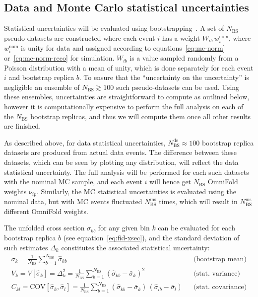 \subsection{Data and Monte Carlo statistical uncertainties}
Statistical uncertainties will be evaluated using bootstrapping~\cite{ATLAS-bootstrap}.  A set of $N_\mathrm{BS}$ pseudo-datasets are constructed where each event $i$ has a weight $W_{ib}\,w^\text{nom}_i$, where $w^\text{nom}_{i}$ is unity for data and assigned according to equations~\ref{eq:mc-norm} or~\ref{eq:mc-norm-reco} for simulation. $W_{ib}$ is a value sampled randomly from a Poisson distribution with a mean of unity, which is done separately for each event $i$ and bootstrap replica $b$.  To ensure that the ``uncertainty on the uncertainty'' is negligible an ensemble of $N_\mathrm{BS} \gtrsim 100$ such pseudo-datasets can be used.
Using these ensembles, uncertainties are straightforward to compute as outlined below, however it is computationally expensive to perform the full analysis on each of the $N_\mathrm{BS}$ bootstrap replicas, and thus we will compute them once all other results are finished.

As described above, for data statistical uncertainties, $N_\mathrm{BS}^\mathrm{ds} \approx 100$ bootstrap replica datasets are produced from actual data events.
The difference between these datasets, which can be seen by plotting any distribution, will reflect the data statistical uncertainty.
The full analysis will be performed for each such datasets with the nominal MC sample, and each event $i$ will hence get $N_\mathrm{BS}$ OmniFold weights $\nu_{ip}$. 
Similarly, the MC statistical uncertainties is evaluated using the nominal data, but with MC events fluctuated $N_\mathrm{BS}^\mathrm{ms}$ times, which will result in $N_\mathrm{BS}^\mathrm{ms}$ different OmniFold weights.

The unfolded cross section $\sigma_{kb}$ for any given bin $k$ can be evaluated for each bootstrap replica $b$ (see equation~\ref{eq:fid-xsec}), and the standard  deviation of such estimates $\Delta_{k}$ constitutes the associated statistical uncertainty:
\begin{eqnarray}
  \label{eq:bs}
  \bar{\sigma}_k = \frac{1}{N_\mathrm{BS}}\sum_{b=1}^{N_\mathrm{BS}} \hat{\sigma}_{kb} 
  & & \text{(bootstrap mean)}\\
  V_k = V[\hat{\sigma}_k] = \Delta_k^2 = \frac{1}{N_\mathrm{BS}}\sum_{b=1}^{N_\mathrm{BS}} \left(\hat{\sigma}_{kb} - \bar{\sigma}_k\right)^2 
  & & \text{(stat. variance)}\\
  C_{kl} = \mathrm{COV}[\hat{\sigma}_k,\hat{\sigma}_l] = \frac{1}{N_\mathrm{BS}}\sum_{b=1}^{N_\mathrm{BS}} \left(\hat{\sigma}_{kb} - \bar{\sigma}_k\right)\,\left(\hat{\sigma}_{lb} - \bar{\sigma}_l\right) 
  & & \text{(stat. covariance)}
\end{eqnarray}

